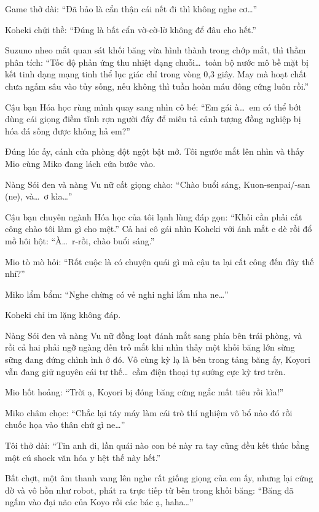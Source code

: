 \documentclass[../main.tex]{subfiles}
\begin{document}
Game thở dài: ``Đã bảo là cẩn thận cái nết đi thì không nghe cơ\dots''

Koheki chửi thề: ``Đúng là bất cẩn vờ-cờ-lờ không để đâu cho hết.''

Suzuno nheo mắt quan sát khối băng vừa hình thành trong chớp mắt, thì thầm phân tích: ``Tốc độ phản ứng thu nhiệt dạng chuỗi\dots\ toàn bộ nước mô bề mặt bị kết tinh dạng mạng tinh thể lục giác chỉ trong vòng 0,3 giây. May mà hoạt chất chưa ngấm sâu vào tủy sống, nếu không thì tuần hoàn máu đông cứng luôn rồi.''

Cậu bạn Hóa học rùng mình quay sang nhìn cô bé: ``Em gái à\dots\ em có thể bớt dùng cái giọng điềm tĩnh rợn người đấy để miêu tả cảnh tượng đồng nghiệp bị hóa đá sống được không hả em?''

Đúng lúc ấy, cánh cửa phòng đột ngột bật mở. Tôi ngước mắt lên nhìn và thấy Mio cùng Miko đang lách cửa bước vào.

Nàng Sói đen và nàng Vu nữ cất giọng chào: ``Chào buổi sáng, Kuon-senpai/-san (ne), và\dots\ ơ kìa\dots''

Cậu bạn chuyên ngành Hóa học của tôi lạnh lùng đáp gọn: ``Khỏi cần phải cất công chào tôi làm gì cho mệt.'' Cả hai cô gái nhìn Koheki với ánh mắt e dè rồi đổ mồ hôi hột: ``À\dots\ r-rồi, chào buổi sáng.''

Mio tò mò hỏi: ``Rốt cuộc là có chuyện quái gì mà cậu ta lại cất công đến đây thế nhỉ?''

Miko lẩm bẩm: ``Nghe chừng có vẻ nghi nghi lắm nha ne\dots''

Koheki chỉ im lặng không đáp.

Nàng Sói đen và nàng Vu nữ đồng loạt đánh mắt sang phía bên trái phòng, và rồi cả hai phải ngỡ ngàng đến trố mắt khi nhìn thấy một khối băng lớn sừng sững đang đứng chình ình ở đó. Vô cùng kỳ lạ là bên trong tảng băng ấy, Koyori vẫn đang giữ nguyên cái tư thế\dots\ cầm điện thoại tự sướng cực kỳ trơ trẽn.


Mio hốt hoảng: ``Trời ạ, Koyori bị đóng băng cứng ngắc mất tiêu rồi kìa!''

Miko châm chọc: ``Chắc lại táy máy làm cái trò thí nghiệm vô bổ nào đó rồi chuốc họa vào thân chứ gì ne\dots''

Tôi thở dài: ``Tin anh đi, lần quái nào con bé này ra tay cũng đều kết thúc bằng một cú shock văn hóa y hệt thế này hết.''

Bất chợt, một âm thanh vang lên nghe rất giống giọng của em ấy, nhưng lại cứng đờ và vô hồn như robot, phát ra trực tiếp từ bên trong khối băng: ``Băng đã ngấm vào đại não của Koyo rồi các bác ạ, haha\dots''
\end{document}
